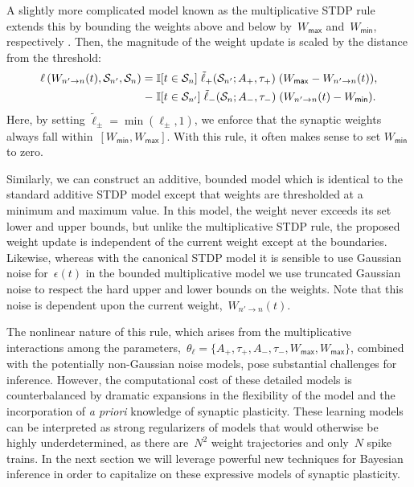 A slightly more complicated model known as the multiplicative STDP
rule extends this by bounding the weights above and below
by~$W_{\mathsf{max}}$ and~$W_{\mathsf{min}}$, respectively
\cite{Morrison-2008}. Then, the magnitude of the weight update is
scaled by the distance from the threshold:
\begin{align}
 \label{eqn:MultSTDP}
 \ell\left(W_{n' \to n}(t), \mathcal{S}_{n'}, \mathcal{S}_{n} \right) = 
 \;&\mathbb{I}[t \in \mathcal{S}_{n}]\;  \tilde\ell_+(\mathcal{S}_{n'}; A_+, \tau_+) \;(W_{\mathsf{max}}-W_{n'\to n}(t)), \nonumber \\
  \;-\; &\mathbb{I}[t \in \mathcal{S}_{n'}]\;  \tilde\ell_-(\mathcal{S}_{n}; A_-, \tau_-)\;(W_{n'\to n}(t)-W_{\mathsf{min}}).
\end{align}
Here, by setting ${\tilde\ell_\pm = \min(\ell_\pm,1)}$, we enforce
that the synaptic weights always fall within~${[W_{\mathsf{min}},
    W_{\mathsf{max}}]}$. With this rule, it often makes sense to set
$W_{\mathsf{min}}$ to zero.

Similarly, we can construct an additive, bounded model which is
identical to the standard additive STDP model except that weights are
thresholded at a minimum and maximum value. In this model, the weight
never exceeds its set lower and upper bounds, but unlike the
multiplicative STDP rule, the proposed weight update is independent of
the current weight except at the boundaries. Likewise, whereas with
the canonical STDP model it is sensible to use Gaussian noise
for~$\epsilon(t)$ in the bounded multiplicative model we use truncated
Gaussian noise to respect the hard upper and lower bounds on the
weights.  Note that this noise is dependent upon the current
weight,~$W_{n'\to n}(t)$.

The nonlinear nature of this rule, which arises from the
multiplicative interactions among the parameters,~${\theta_\ell =
  \{A_+,\tau_+,A_-,\tau_-,W_{\mathsf{max}}, W_{\mathsf{max}}\}}$,
combined with the potentially non-Gaussian noise models, pose
substantial challenges for inference. However, the computational cost
of these detailed models is counterbalanced by dramatic expansions in
the flexibility of the model and the incorporation of \emph{a priori}
knowledge of synaptic plasticity. These learning models can be
interpreted as strong regularizers of models that would otherwise be
highly underdetermined, as there are~$N^2$ weight trajectories and
only~$N$ spike trains. In the next section we will leverage powerful
new techniques for Bayesian inference in order to capitalize on these
expressive models of synaptic plasticity.


